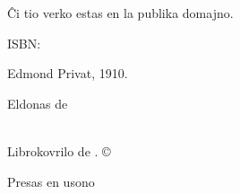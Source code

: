 \singlespacing
\thispagestyle{empty}
\null
\vfill
{\parindent0pt
Ĉi tio verko estas en la publika domajno.

\vspace{1ex}

ISBN: \ISBN

\vspace{1ex}

\textsc{\FullTitle}

\vspace{1ex}

Edmond Privat, 1910.

\vspace{1ex}

Eldonas de \Publisher\\
\PublisherURL\\
\PublisherLocation

\vspace{1ex}

\PublisherEmail

\vspace{1ex}

Librokovrilo de \Illustrator. \copyright\ \Year

\vspace{1ex}

Presas en usono\\
\EditionsList
}%

\clearpage
